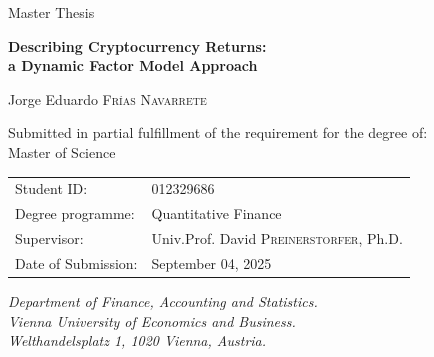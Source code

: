 \documentclass[
  12pt,
  a4paper,
  openany]{scrbook}
\begin{document}
\begin{center}
    \large Master Thesis \\
    \vspace{0.5cm}

    \textbf{\huge Describing Cryptocurrency Returns:\\
a Dynamic Factor Model Approach} \\
    \vspace{1cm}

        \LARGE Jorge Eduardo \textsc{Frías Navarrete} \\
    \vspace{0.5cm}
        \vspace{2cm}
    
    \normalsize Submitted in partial fulfillment of the requirement for the degree of: \\
    \LARGE Master of Science \\
\vspace{2cm}

\normalsize
    \begin{tabular}{ll}
        Student ID: & 012329686 \\
        Degree programme: & Quantitative Finance \\
        Supervisor: & Univ.Prof. David \textsc{Preinerstorfer}, Ph.D. \\
        Date of Submission: & September 04, 2025
    \end{tabular}
    \vspace{2cm}
    
    \textit{
      Department of Finance, Accounting and Statistics. \\
      Vienna University of Economics and Business. \\
      Welthandelsplatz 1, 1020 Vienna, Austria.
    }

\end{center}

\restoregeometry


% 
\end{document}
